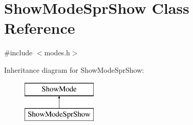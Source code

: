 \hypertarget{a00142}{\section{Show\-Mode\-Spr\-Show Class Reference}
\label{a00142}
}


{\ttfamily \#include $<$modes.\-h$>$}

Inheritance diagram for Show\-Mode\-Spr\-Show\-:\begin{figure}[H]
\begin{center}
\leavevmode
\includegraphics[height=2.000000cm]{a00142}
\end{center}
\end{figure}
